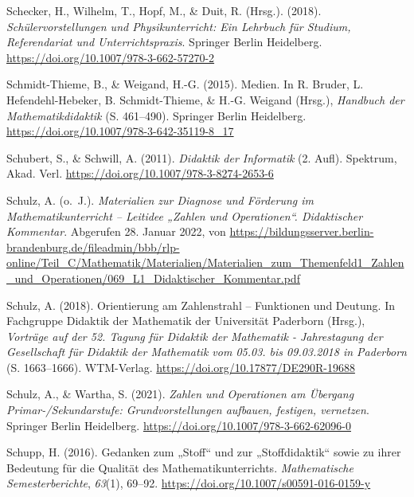 \documentclass[
]{scrbook}
\newlength{\cslhangindent}
\newlength{\cslentryspacingunit} %
\newenvironment{CSLReferences}[2] %
 {%
  \setlength{\parindent}{0pt}
  \ifodd #1
  \let\oldpar\par
  \def\par{\hangindent=\cslhangindent\oldpar}
  \fi
  \setlength{\parskip}{#2\cslentryspacingunit}
 }%
 {}
\theoremstyle{definition}
\theoremstyle{definition}
\theoremstyle{definition}
\theoremstyle{definition}
\theoremstyle{remark}
\begin{document}
\begin{CSLReferences}{1}{0}
\leavevmode{}%
Schecker, H., Wilhelm, T., Hopf, M., \& Duit, R. (Hrsg.). (2018). \emph{Schülervorstellungen und {Physikunterricht}: {Ein} {Lehrbuch} für {Studium}, {Referendariat} und {Unterrichtspraxis}}. Springer Berlin Heidelberg. \url{https://doi.org/10.1007/978-3-662-57270-2}

\leavevmode{}%
Schmidt-Thieme, B., \& Weigand, H.-G. (2015). Medien. In R. Bruder, L. Hefendehl-Hebeker, B. Schmidt-Thieme, \& H.-G. Weigand (Hrsg.), \emph{Handbuch der {Mathematikdidaktik}} (S. 461--490). Springer Berlin Heidelberg. \url{https://doi.org/10.1007/978-3-642-35119-8_17}

\leavevmode{}%
Schubert, S., \& Schwill, A. (2011). \emph{Didaktik der {Informatik}} (2. Aufl). Spektrum, Akad. Verl. \url{https://doi.org/10.1007/978-3-8274-2653-6}

\leavevmode{}%
Schulz, A. (o.~J.). \emph{Materialien zur {Diagnose} und {Förderung} im {Mathematikunterricht} -- {Leitidee} „{Zahlen} und {Operationen}``. {Didaktischer} {Kommentar}}. Abgerufen 28. Januar 2022, von \url{https://bildungsserver.berlin-brandenburg.de/fileadmin/bbb/rlp-online/Teil_C/Mathematik/Materialien/Materialien_zum_Themenfeld1_Zahlen_und_Operationen/069_L1_Didaktischer_Kommentar.pdf}

\leavevmode{}%
Schulz, A. (2018). Orientierung am {Zahlenstrahl} -- {Funktionen} und {Deutung}. In Fachgruppe Didaktik der Mathematik der Universität Paderborn (Hrsg.), \emph{Vorträge auf der 52. Tagung für Didaktik der Mathematik - Jahrestagung der Gesellschaft für Didaktik der Mathematik vom 05.03. bis 09.03.2018 in Paderborn} (S. 1663--1666). WTM-Verlag. \url{https://doi.org/10.17877/DE290R-19688}

\leavevmode{}%
Schulz, A., \& Wartha, S. (2021). \emph{Zahlen und {Operationen} am Übergang {Primar}-/{Sekundarstufe}: {Grundvorstellungen} aufbauen, festigen, vernetzen}. Springer Berlin Heidelberg. \url{https://doi.org/10.1007/978-3-662-62096-0}

\leavevmode{}%
Schupp, H. (2016). Gedanken zum „{Stoff}`` und zur „{Stoffdidaktik}`` sowie zu ihrer {Bedeutung} für die {Qualität} des {Mathematikunterrichts}. \emph{Mathematische Semesterberichte}, \emph{63}(1), 69--92. \url{https://doi.org/10.1007/s00591-016-0159-y}


\end{CSLReferences}
\end{document}
